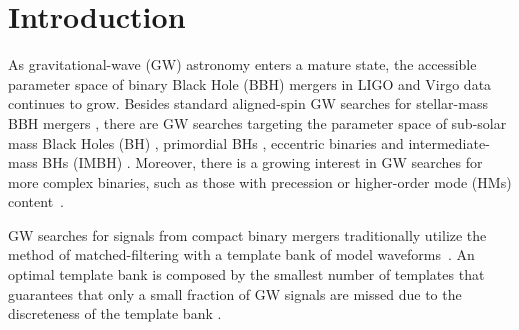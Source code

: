 \documentclass[twocolumn,showpacs,preprintnumbers,nofootinbib,prd,
superscriptaddress,10pt]{revtex4-2}
\begin{document}
	\author{Sarah }
	\maketitle
\section{Introduction}

As gravitational-wave (GW) astronomy enters a mature state, the accessible parameter space of binary Black Hole (BBH) mergers in LIGO \cite{LIGOScientific:2014pky} and Virgo \cite{VIRGO:2014yos} data continues to grow. Besides standard aligned-spin GW searches for stellar-mass BBH mergers \cite{GWTC-1,GWTC-2,GWTC-2.1, GWTC-3}, there are GW searches targeting the parameter space of sub-solar mass Black Holes (BH) \cite{SSM_O2, SSM_O3a, PhysRevD.106.023024, Nitz:2021mzz}, primordial BHs \cite{PBH}, eccentric binaries \cite{PhysRevD.102.043005, PhysRevD.104.104016, Nitz:2019spj, LIGOScientific:2019dag, Ramos-Buades:2020eju, Wang:2021qsu, Nitz:2021mzz} and intermediate-mass BHs (IMBH) \cite{IMBH_O2, IMBH_O3, Chandra:2022ixv}. Moreover, there is a growing interest in GW searches for more complex binaries, such as those with precession \cite{PhysRevD.89.024010, Harry:2017weg, PhysRevD.102.041302, Indik:2016qky, Harry:2016ijz, Fairhurst:2019vut, McIsaac:2023ijd} or higher-order mode (HMs) content~\cite{CalderonBustillo:2015lrt, Harry:2017weg, Chandra_hom, 2021PhRvD.103b4042M}.

GW searches for signals from compact binary mergers traditionally utilize the method of matched-filtering with a template bank of model waveforms~\cite{Sathyaprakash:1991mt, Dhurandhar:1992mw, Owen:1998dk, Allen:2005fk, Babak:2006ty, Cokelaer:2007mv}.
An optimal template bank is composed by the smallest number of templates that guarantees that only a small fraction of GW signals are missed due to the discreteness of the template bank \cite{Prix:2007ks}.
\end{document}
